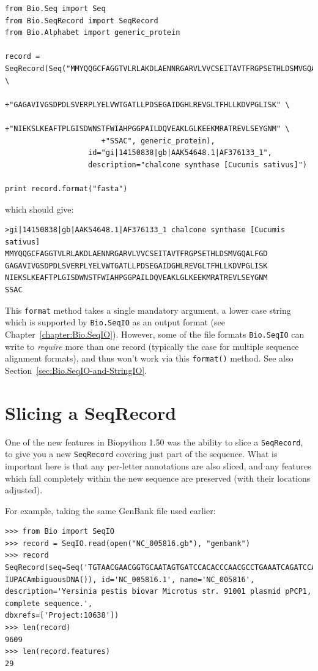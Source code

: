 \documentclass{report}
\begin{document}
\begin{verbatim}
from Bio.Seq import Seq
from Bio.SeqRecord import SeqRecord
from Bio.Alphabet import generic_protein

record = SeqRecord(Seq("MMYQQGCFAGGTVLRLAKDLAENNRGARVLVVCSEITAVTFRGPSETHLDSMVGQALFGD" \
                      +"GAGAVIVGSDPDLSVERPLYELVWTGATLLPDSEGAIDGHLREVGLTFHLLKDVPGLISK" \
                      +"NIEKSLKEAFTPLGISDWNSTFWIAHPGGPAILDQVEAKLGLKEEKMRATREVLSEYGNM" \
                      +"SSAC", generic_protein),
                   id="gi|14150838|gb|AAK54648.1|AF376133_1",
                   description="chalcone synthase [Cucumis sativus]")
                   
print record.format("fasta")
\end{verbatim}
\noindent which should give:
\begin{verbatim}
>gi|14150838|gb|AAK54648.1|AF376133_1 chalcone synthase [Cucumis sativus]
MMYQQGCFAGGTVLRLAKDLAENNRGARVLVVCSEITAVTFRGPSETHLDSMVGQALFGD
GAGAVIVGSDPDLSVERPLYELVWTGATLLPDSEGAIDGHLREVGLTFHLLKDVPGLISK
NIEKSLKEAFTPLGISDWNSTFWIAHPGGPAILDQVEAKLGLKEEKMRATREVLSEYGNM
SSAC
\end{verbatim}

This \verb|format| method takes a single mandatory argument, a lower case string which is
supported by \verb|Bio.SeqIO| as an output format (see Chapter~\ref{chapter:Bio.SeqIO}).
However, some of the file formats \verb|Bio.SeqIO| can write to \emph{require} more than
one record (typically the case for multiple sequence alignment formats), and thus won't
work via this \verb|format()| method.  See also Section~\ref{sec:Bio.SeqIO-and-StringIO}.

\section{Slicing a SeqRecord}
\label{sec:SeqRecord-slicing}

One of the new features in Biopython 1.50 was the ability to slice a \verb|SeqRecord|,
to give you a new \verb|SeqRecord| covering just part of the sequence. What is important
here is that any per-letter annotations are also sliced, and any features which fall
completely within the new sequence are preserved (with their locations adjusted).

For example, taking the same GenBank file used earlier:

\begin{verbatim}
>>> from Bio import SeqIO
>>> record = SeqIO.read(open("NC_005816.gb"), "genbank")
>>> record
SeqRecord(seq=Seq('TGTAACGAACGGTGCAATAGTGATCCACACCCAACGCCTGAAATCAGATCCAGG...CTG',
IUPACAmbiguousDNA()), id='NC_005816.1', name='NC_005816',
description='Yersinia pestis biovar Microtus str. 91001 plasmid pPCP1, complete sequence.',
dbxrefs=['Project:10638'])
>>> len(record)
9609
>>> len(record.features)
29
\end{verbatim}
\end{document}
